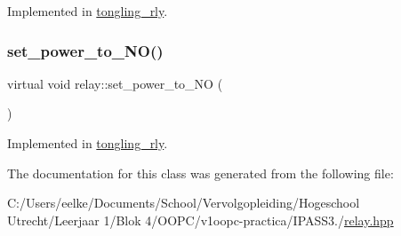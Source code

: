 Implemented in \hyperlink{classtongling__rly_a22fd7f16fa1236537d168590d72b0b02}{tongling\+\_\+rly}.

\mbox{\label{classrelay_ad846781772d5291d973300789260690b}} 
\subsubsection{\texorpdfstring{set\+\_\+power\+\_\+to\+\_\+\+N\+O()}{set\_power\_to\_NO()}}
{\footnotesize\ttfamily virtual void relay\+::set\+\_\+power\+\_\+to\+\_\+\+NO (\begin{DoxyParamCaption}{ }\end{DoxyParamCaption})\hspace{0.3cm}{\ttfamily [pure virtual]}}



Implemented in \hyperlink{classtongling__rly_a618742658d2d1dc0fd99993eabb61b7c}{tongling\+\_\+rly}.



The documentation for this class was generated from the following file\+:\begin{DoxyCompactItemize}
\item 
C\+:/\+Users/eelke/\+Documents/\+School/\+Vervolgopleiding/\+Hogeschool Utrecht/\+Leerjaar 1/\+Blok 4/\+O\+O\+P\+C/v1oopc-\/practica/\+I\+P\+A\+S\+S3./\hyperlink{relay_8hpp}{relay.\+hpp}\end{DoxyCompactItemize}
